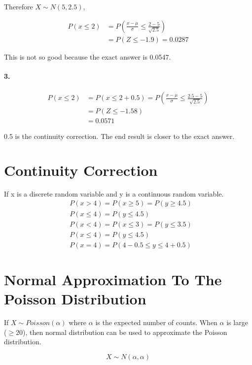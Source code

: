 \documentclass{article}
\begin{document}
    Therefore $X \sim N(5, 2.5)$,

    \begin{align*}
        P(x\leq 2) &= P(\frac{x - \mu}{\sigma} \leq \frac{2-5}{\sqrt{2.5}})\\
        &= P(Z\leq-1.9) = 0.0287
    \end{align*}

    This is not so good because the exact answer is 0.0547.

    \paragraph{3.}

    \begin{align*}
        P(x \leq 2) &= P(x \leq 2 + 0.5) = P(\frac{x - \mu}{\sigma} \leq \frac{2.5-5}{\sqrt{2.5}})\\
        &= P(Z\leq-1.58)\\
        &= 0.0571
    \end{align*}
    
    0.5 is the continuity correction. The end result is closer to the exact answer.

    \section*{Continuity Correction}
    If x is a discrete random variable and y is a continuous random variable.
    \begin{align*}
        &P(x>4) = P(x\geq 5) = P(y \geq 4.5)\\
        &P(x \leq 4) = P(y \leq 4.5)\\
        &P(x<4) = P(x \leq 3) = P(y \leq3.5)\\
        &P(x \leq 4) = P(y \leq 4.5)\\
        &P(x = 4) = P(4-0.5 \leq y \leq 4+0.5)
    \end{align*}

    \section*{Normal Approximation To The Poisson Distribution}
    If $X \sim Poisson(\alpha)$ where $\alpha$ is the expected number of counts.
    When $\alpha$ is large ($\geq 20$), then normal distribution can be used to approximate the
    Poisson distribution.
    
    \begin{equation*}
        X \sim N(\alpha, \alpha)
    \end{equation*}
    
\end{document}
